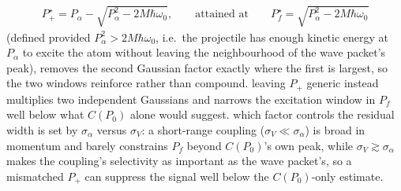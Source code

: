 \begin{align}
    P_+^\star = P_\alpha-\sqrt{P_\alpha^2-2M\hbar\omega_0},\qquad\text{attained at}\qquad P_f^\star=\sqrt{P_\alpha^2-2M\hbar\omega_0}\label{eq:tls-one-absorber-forward-Pplus}
\end{align}
(defined provided $P_\alpha^2>2M\hbar\omega_0$, i.e.\ the projectile has enough kinetic energy at $P_\alpha$ to excite the atom without leaving the neighbourhood of the wave packet's peak), removes the second Gaussian factor exactly where the first is largest, so the two windows reinforce rather than compound. leaving $P_+$ generic instead multiplies two independent Gaussians and narrows the excitation window in $P_f$ well below what $C(P_0)$ alone would suggest. which factor controls the residual width is set by $\sigma_\alpha$ versus $\sigma_V$: a short-range coupling ($\sigma_V\ll\sigma_\alpha$) is broad in momentum and barely constrains $P_f$ beyond $C(P_0)$'s own peak, while $\sigma_V\gtrsim\sigma_\alpha$ makes the coupling's selectivity as important as the wave packet's, so a mismatched $P_+$ can suppress the signal well below the $C(P_0)$-only estimate.

